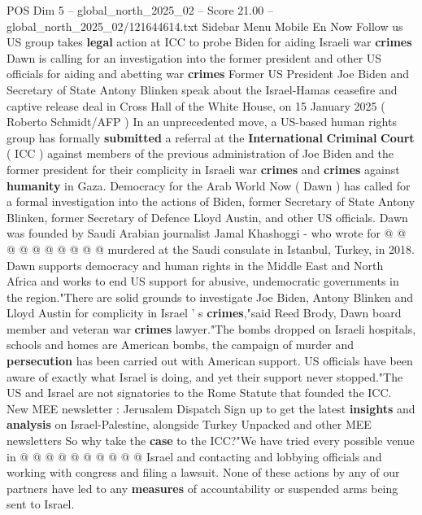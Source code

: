 \begin{textsample}{POS Dim 5 – global\_north\_2025\_02 – Score 21.00 – global\_north\_2025\_02/121644614.txt}  \label{ex:f5_pos_202}
Sidebar Menu Mobile En Now Follow us US group takes \textbf{legal} action at ICC to probe Biden for aiding Israeli war \textbf{crimes} Dawn is calling for an investigation into the former president and other US officials for aiding and abetting war \textbf{crimes} Former US President Joe Biden and Secretary of State Antony Blinken speak about the Israel-Hamas ceasefire and captive release deal in Cross Hall of the White House, on 15 January 2025 ( Roberto Schmidt/AFP ) In an unprecedented move, a US-based human rights group has formally \textbf{submitted} a referral at the \textbf{International} \textbf{Criminal} \textbf{Court} ( ICC ) against members of the previous administration of Joe Biden and the former president for their complicity in Israeli war \textbf{crimes} and \textbf{crimes} against \textbf{humanity} in Gaza.
Democracy for the Arab World Now ( Dawn ) has called for a formal investigation into the actions of Biden, former Secretary of State Antony Blinken, former Secretary of Defence Lloyd Austin, and other US officials.
Dawn was founded by Saudi Arabian journalist Jamal Khashoggi - who wrote for @ @ @ @ @ @ @ @ @ @ murdered at the Saudi consulate in Istanbul, Turkey, in 2018.
Dawn supports democracy and human rights in the Middle East and North Africa and works to end US support for abusive, undemocratic governments in the region."There are solid grounds to investigate Joe Biden, Antony Blinken and Lloyd Austin for complicity in Israel ' s \textbf{crimes},"said Reed Brody, Dawn board member and veteran war \textbf{crimes} lawyer."The bombs dropped on Israeli hospitals, schools and homes are American bombs, the campaign of murder and \textbf{persecution} has been carried out with American support.
US officials have been aware of exactly what Israel is doing, and yet their support never stopped."The US and Israel are not signatories to the Rome Statute that founded the ICC.
New MEE newsletter : Jerusalem Dispatch Sign up to get the latest \textbf{insights} and \textbf{analysis} on Israel-Palestine, alongside Turkey Unpacked and other MEE newsletters So why take the \textbf{case} to the ICC?"We have tried every possible venue in @ @ @ @ @ @ @ @ @ @ Israel and contacting and lobbying officials and working with congress and filing a lawsuit.
None of these actions by any of our partners have led to any \textbf{measures} of accountability or suspended arms being sent to Israel.

\end{textsample}

